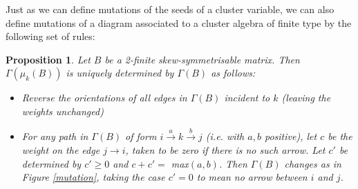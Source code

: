 \documentclass[11pt]{amsart}
\newtheorem{prop}[thm]{Proposition}
\theoremstyle{definition}
\begin{document}
Just as we can define mutations of the seeds of a cluster variable, we can also define mutations of a diagram associated to a cluster algebra of finite type by the following set of rules:
\begin{prop}\cite[Proposition 1.4]{BM13}
Let $B$ be a 2-finite skew-symmetrisable matrix. Then $\Gamma(\mu_k(B))$ is uniquely determined by $\Gamma(B)$ as follows:
\begin{itemize}
\item Reverse the orientations of all edges in $\Gamma(B)$ incident to $k$ (leaving the weights unchanged)
\item For any path in $\Gamma(B)$ of form $i \xrightarrow{a} k \xrightarrow{b} j$ (i.e. with $a,b$ positive), let $c$ be the weight on the edge $j \rightarrow i$, taken to be zero if there is no such arrow. Let $c'$ be determined by $c'\geq 0$ and
$c+c' =$ max$(a,b)$.
Then $\Gamma(B)$ changes as in Figure \ref{mutation}, taking the case $c' = 0$ to mean no arrow between $i$ and $j$.
\end{itemize}
\end{prop}

\begin{center}
   \end{center}
   
\end{document}
